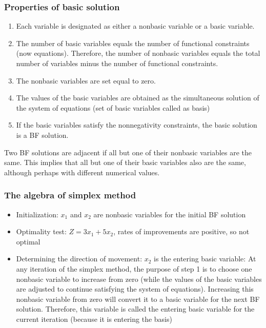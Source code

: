 \documentclass[12pt]{article}
\begin{document}
  \subsubsection*{Properties of basic solution}
  \begin{enumerate}
  \item Each variable is designated as either a nonbasic variable or a basic variable.
  \item The number of basic variables equals the number of functional constraints (now equations). Therefore, the number of nonbasic 
variables equals the total number of variables minus the number of functional constraints.
\item The nonbasic variables are set equal to zero.
\item The values of the basic variables are obtained as the simultaneous solution of the system of equations (set of basic variables called as basis)
\item If the basic variables satisfy the nonnegativity constraints, the basic solution is a BF solution.
  \end{enumerate}
Two BF solutions are adjacent if all but one of their nonbasic variables are the same.
This implies that all but one of their basic variables also are the same, although perhaps
with different numerical values.


  \subsubsection*{The algebra of simplex method}
  \begin{itemize}
  \item Initialization: $x_1$ and $x_2$ are nonbasic variables for the initial BF solution
  \item Optimality test: $Z=3 x_1 + 5 x_2$, rates of improvements are positive, so not optimal
  \item Determining the direction of movement: $x_2$ is the entering basic variable:
At any iteration of the simplex method, the purpose of step 1 is to choose one nonbasic
variable to increase from zero (while the values of the basic variables are adjusted to continue satisfying the system of equations). Increasing this nonbasic variable from zero will
convert it to a basic variable for the next BF solution. Therefore, this variable is called
the entering basic variable for the current iteration (because it is entering the basis)
  \end{itemize}
\end{document}
